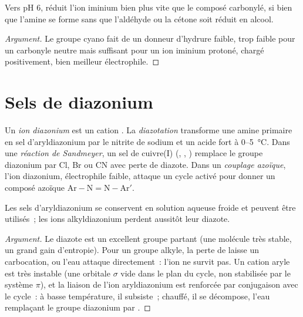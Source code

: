 \begin{proposition}\label{prop:b2:amines:reductive-amination}
Vers pH 6,  réduit l'ion iminium bien plus vite que le composé carbonylé, si bien que
l'amine se forme sans que l'aldéhyde ou la cétone soit réduit en alcool.
\end{proposition}

\begin{proof}[Argument]
Le groupe cyano fait de  un donneur d'hydrure faible, trop faible pour un carbonyle
neutre mais suffisant pour un ion iminium protoné, chargé positivement, bien meilleur électrophile.
\end{proof}

\section{Sels de diazonium}

\begin{definition}\label{def:b2:amines:diazonium}
Un \emph{ion diazonium} est un cation . La \emph{diazotation}
transforme une amine  primaire en sel d'aryldiazonium par le nitrite de sodium et un
acide fort à 0--\qty{5}{\degreeCelsius}. Dans une \emph{réaction de Sandmeyer}, un sel de cuivre(I)
(, , ) remplace le groupe diazonium par Cl, Br ou CN avec perte de
diazote. Dans un \emph{couplage azoïque}, l'ion diazonium, électrophile faible,
attaque un cycle  activé pour donner un composé azoïque $\mathrm{Ar{-}N{=}N{-}Ar'}$.
\end{definition}

\begin{proposition}\label{prop:b2:amines:diazonium}
Les sels d'aryldiazonium se conservent en solution aqueuse froide et peuvent être utilisés~; les
ions alkyldiazonium perdent aussitôt leur diazote.
\end{proposition}

\begin{proof}[Argument]
Le diazote est un excellent groupe partant (une molécule très stable, un grand gain d'entropie).
Pour un groupe alkyle, la perte de  laisse un carbocation, ou l'eau attaque directement~:
l'ion ne survit pas. Un cation aryle est très instable (une orbitale $\sigma$ vide dans le plan du
cycle, non stabilisée par le système $\pi$), et la liaison  de l'ion aryldiazonium est
renforcée par conjugaison avec le cycle~: à basse température, il subsiste~; chauffé, il se
décompose, l'eau remplaçant le groupe diazonium par .
\end{proof}

